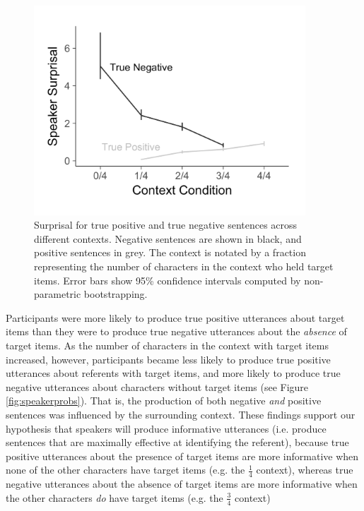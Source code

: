 \documentclass[man, floatsintext, noapacite]{apa6}
\begin{document}
\begin{figure}[t]
\begin{center} 
\includegraphics[width=4in]{figures/surprisals_mod2.pdf}
\caption{\label{fig:speakersurprise} Surprisal for true positive and true negative sentences across different contexts. Negative sentences are shown in black, and positive sentences in grey.  The context is notated by a fraction representing the number of characters in the context who held target items. Error bars show 95\% confidence intervals computed by non-parametric bootstrapping.  }
\end{center} 
\end{figure}

Participants were more likely to produce true positive utterances about target items than they were to produce true negative utterances about the \textit{absence} of target items. As the number of characters in the context with target items increased, however, participants became less likely to produce true positive utterances about referents with target items, and more likely to produce true negative utterances about characters without target items (see Figure \ref{fig:speakerprobs}). That is, the production of both negative \textit{and} positive sentences was influenced by the surrounding context. These findings support our hypothesis that speakers will produce informative utterances (i.e. produce sentences that are maximally effective at identifying the referent), because true positive utterances about the presence of target items are more informative when none of the other characters have target items (e.g. the $\frac{1}{4}$ context), whereas true negative utterances about the absence of target items are more informative when the other characters \textit{do} have target items (e.g. the $\frac{3}{4}$ context)
\end{document}
